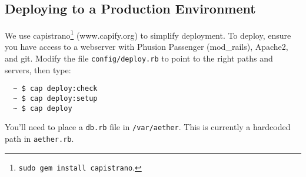 \documentclass[12pt, letterpaper]{article}
\begin{document}
\subsection{Deploying to a Production Environment}
We use capistrano\footnote{{\tt sudo gem install capistrano}.} (www.capify.org) to simplify deployment. To deploy, ensure you have access to a webserver with Phusion Passenger (mod\_rails), Apache2, and git. Modify the file \verb!config/deploy.rb! to point to the right paths and servers, then type:
\begin{verbatim}
  ~ $ cap deploy:check
  ~ $ cap deploy:setup
  ~ $ cap deploy
\end{verbatim}
You'll need to place a \verb!db.rb! file in \verb!/var/aether!. This is currently a hardcoded path in \verb!aether.rb!.
\end{document}
